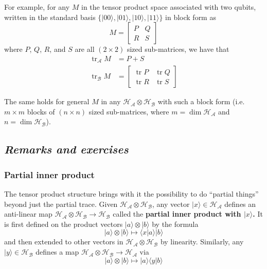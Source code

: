 \documentclass[fleqn]{article}
\begin{document}
For example, for any \(M\) in the tensor product space associated with two qubits, written in the standard basis \(\{|00\rangle,|01\rangle,|10\rangle,|11\rangle\}\) in block form as
\[
  M =
  \left[
    \begin{array}{c|c}
      P & Q
    \\\hline
      R & S
    \end{array}
  \right]
\]
where \(P\), \(Q\), \(R\), and \(S\) are all \((2\times 2)\) sized sub-matrices, we have that
\[
  \begin{aligned}
    \operatorname{tr}_{\mathcal{A}} M
    &= P+S
  \\\operatorname{tr}_{\mathcal{B}} M
    &=
  \left[
    \begin{array}{c|c}
      \operatorname{tr}P & \operatorname{tr}Q
    \\\hline
      \operatorname{tr}R & \operatorname{tr}S
    \end{array}
  \right]
  \end{aligned}
\]

The same holds for general \(M\) in any \(\mathcal{H}_{\mathcal{A}}\otimes\mathcal{H}_{\mathcal{B}}\) with such a block form (i.e.~\(m\times m\) blocks of \((n\times n)\) sized sub-matrices, where \(m=\dim\mathcal{H}_{\mathcal{A}}\) and \(n=\dim\mathcal{H}_{\mathcal{B}}\)).

\hypertarget{remarks-and-exercises-6}{%
\subsection{\texorpdfstring{\emph{Remarks and exercises}}{Remarks and exercises}}\label{remarks-and-exercises-6}}

\hypertarget{partial-inner-product}{%
\subsubsection{Partial inner product}\label{partial-inner-product}}

The tensor product structure brings with it the possibility to do ``partial things'' beyond just the partial trace.
Given \(\mathcal{H}_{\mathcal{A}}\otimes\mathcal{H}_{\mathcal{B}}\), any vector \(|x\rangle\in\mathcal{H}_{\mathcal{A}}\) defines an anti-linear map \(\mathcal{H}_{\mathcal{A}}\otimes\mathcal{H}_{\mathcal{B}}\to\mathcal{H}_{\mathcal{B}}\) called the \textbf{partial inner product with \(|x\rangle\).}
It is first defined on the product vectors \(|a\rangle\otimes|b\rangle\) by the formula
\[
  |a\rangle\otimes|b\rangle
  \longmapsto \langle x|a\rangle|b\rangle
\]
and then extended to other vectors in \(\mathcal{H}_{\mathcal{A}}\otimes\mathcal{H}_{\mathcal{B}}\) by linearity.
Similarly, any \(|y\rangle\in\mathcal{H}_{\mathcal{B}}\) defines a map \(\mathcal{H}_{\mathcal{A}}\otimes\mathcal{H}_{\mathcal{B}}\to\mathcal{H}_{\mathcal{A}}\) via
\[
  |a\rangle\otimes|b\rangle
  \longmapsto |a\rangle\langle y|b\rangle
\]
\end{document}
